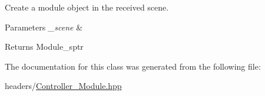 Create a module object in the received scene. 


\begin{DoxyParams}{Parameters}
{\em \+\_\+scene} & \\
\hline
\end{DoxyParams}
\begin{DoxyReturn}{Returns}
Module\+\_\+sptr 
\end{DoxyReturn}


The documentation for this class was generated from the following file\+:\begin{DoxyCompactItemize}
\item 
headers/\mbox{\hyperlink{_controller___module_8hpp}{Controller\+\_\+\+Module.\+hpp}}\end{DoxyCompactItemize}
